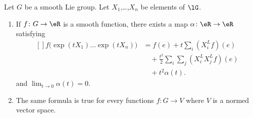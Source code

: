 \begin{proposition}	\label{PROPooGTJLooSuAVGX}
	Let \( G\) be a smooth Lie group. Let \( X_1\),\ldots,\( X_n\) be elements of \( \lG\).
	\begin{enumerate}
		\item
		      If \(f \colon G\to \eR  \) is a smooth function, there exists a map \(\alpha \colon \eR\to \eR  \) satisfying
		      \begin{equation}		\label{EQooFQVUooXOMqEK}
			      \begin{aligned}[]
				      f\big( \exp(tX_1)\ldots \exp(tX_n) \big) & =f(e)+t\sum_i(X_i^Lf)(e)                             \\
				                                               & \quad+\frac{ t^2 }{ 2 } \sum_i\sum_j(X_i^LX_j^Lf)(e) \\
				                                               & \quad+t^2\alpha(t).
			      \end{aligned}
		      \end{equation}
		      and \( \lim_{t\to 0}\alpha(t)=0\).
		\item		\label{ITEMooQQOGooBhgChO}
		      The same formula is true for every functions \(f \colon G\to V  \) where \( V\) is a normed vector space.
	\end{enumerate}
\end{proposition}

